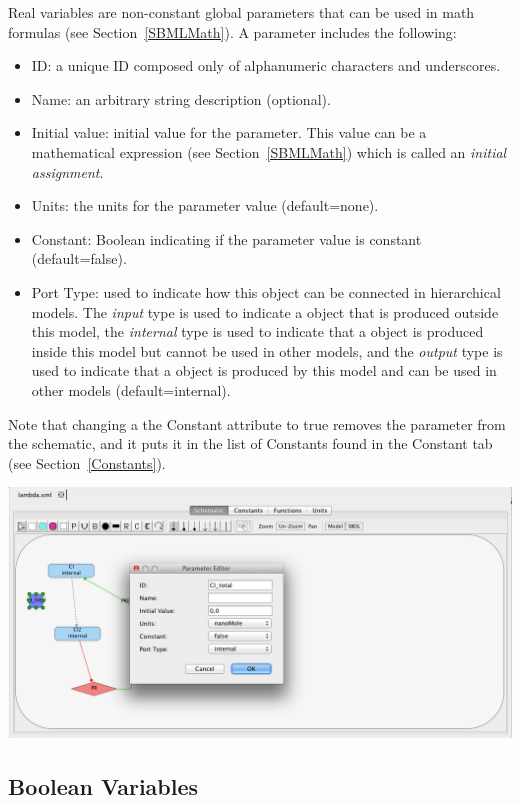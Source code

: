 \documentclass[titlepage,11pt]{article}
\begin{document}
\noindent
Real variables are non-constant global parameters that can be used in math formulas (see Section~\ref{SBMLMath}).  A parameter includes the following:
\begin{itemize}
\item ID: a unique ID composed only of alphanumeric characters and underscores.
\item Name: an arbitrary string description (optional).
\item Initial value: initial value for the parameter.  This value can be a mathematical expression (see Section~\ref{SBMLMath}) which is called an \emph{initial assignment}.
\item Units: the units for the parameter value (default=none).
\item Constant: Boolean indicating if the parameter value is constant (default=false).
\item Port Type: used to indicate how this object can be connected in hierarchical models.  The \emph{input} type is used to indicate a object that is produced outside this model, the \emph{internal} type is used to indicate that a object is produced inside this model but cannot be used in other models, and the \emph{output} type is used to indicate that a object is produced by this model and can be used in other models (default=internal). 
\end{itemize}
Note that changing a the Constant attribute to true removes the parameter from the schematic, and it puts it in the list of Constants found in the Constant tab (see Section~\ref{Constants}).

\begin{center}
\includegraphics[width=160mm]{screenshots/parameter}
\end{center}

\subsection{\label{Booleans}Boolean Variables}
\end{document}

